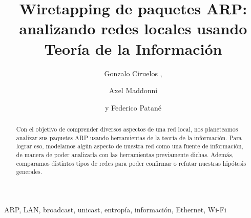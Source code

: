 \documentclass[%
	final, %
	notitlepage,
	narroweqnarray,
	inline,
	twoside,
	]{ieee}
\begin{document}
\title[Wiretapping de paquetes ARP]{%
	Wiretapping de paquetes ARP: analizando redes locales usando Teor\'ia de la Informaci\'on
}

\author[CIRUELOS, MADDONNI, PATAN\'E]{
Gonzalo Ciruelos ,
\and{}Axel Maddonni%
\and{}y Federico Patan\'e
}



\maketitle               


\begin{abstract} 
Con el objetivo de comprender diversos aspectos de una red local, nos planeteamos analizar sus paquetes ARP usando herramientas de la teor\'ia de la informaci\'on.
Para lograr eso, modelamos alg\'un aspecto de nuestra red como una fuente de informaci\'on, de manera de poder analizarla con las herramientas previamente dichas.
Adem\'as, comparamos distintos tipos de redes para poder confirmar o refutar nuestras hip\'otesis generales.
\end{abstract}

\begin{keywords}
ARP, LAN, broadcast, unicast, entrop\'ia, informaci\'on, Ethernet, Wi-Fi
\end{keywords}














\end{document}
